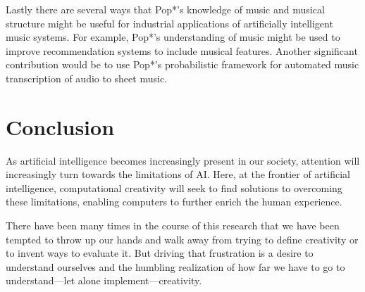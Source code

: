 \documentclass[phd,electronic,oneside,twosidetoc,letterpaper,chaptercenter,parttop,lol,lof,lot]{byumsphd}
\begin{document}
Lastly there are several ways that Pop*'s knowledge of music and musical structure might be useful for industrial applications of artificially intelligent music systems. For example, Pop*'s understanding of music might be used to improve recommendation systems to include musical features. Another significant contribution would be to use Pop*'s probabilistic framework for automated music transcription of audio to sheet music.

\section{Conclusion}

As artificial intelligence becomes increasingly present in our society, attention will increasingly turn towards the limitations of AI. Here, at the frontier of artificial intelligence, computational creativity will seek to find solutions to overcoming these limitations, enabling computers to further enrich the human experience.

There have been many times in the course of this research that we have been tempted to throw up our hands and walk away from trying to define creativity or to invent ways to evaluate it. But driving that frustration is a desire to understand ourselves and the humbling realization of how far we have to go to understand---let alone implement---creativity.
\nocite{*}



\end{document}
